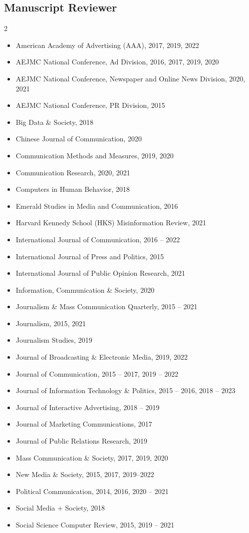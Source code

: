 \documentclass[11pt,letterpaper]{article}
\begin{document}
\subsection*{Manuscript Reviewer}
{\small
\begin{multicols}{2}
\begin{itemize}
\item American Academy of Advertising (AAA), 2017, 2019, 2022
\item AEJMC National Conference, Ad Division, 2016, 2017, 2019, 2020
\item AEJMC National Conference, Newspaper and Online News Division, 2020, 2021
\item AEJMC National Conference, PR Division, 2015
\item Big Data \& Society, 2018
\item Chinese Journal of Communication, 2020
\item Communication Methods and Measures, 2019, 2020
\item Communication Research, 2020, 2021
\item Computers in Human Behavior, 2018
\item Emerald Studies in Media and Communication, 2016
\item Harvard Kennedy School (HKS) Misinformation Review, 2021
\item International Journal of Communication, 2016 -- 2022
\item International Journal of Press and Politics, 2015
\item International Journal of Public Opinion Research, 2021
\item Information, Communication \& Society, 2020
\item Journalism \& Mass Communication Quarterly, 2015 -- 2021
\item Journalism, 2015, 2021
\item Journalism Studies, 2019
\item Journal of Broadcasting \& Electronic Media, 2019, 2022
\item Journal of Communication, 2015 -- 2017, 2019 -- 2022
\item Journal of Information Technology \& Politics, 2015 -- 2016, 2018 -- 2023
\item Journal of Interactive Advertising, 2018 -- 2019
\item Journal of Marketing Communications, 2017
\item Journal of Public Relations Research, 2019
\item Mass Communication \& Society, 2017, 2019, 2020
\item New Media \& Society, 2015, 2017, 2019--2022
\item Political Communication, 2014, 2016, 2020 -- 2021
\item Social Media + Society, 2018
\item Social Science Computer Review, 2015, 2019 -- 2021
\end{itemize}
\end{multicols}
}
\end{document}
